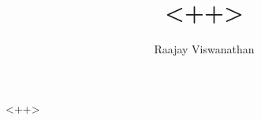 \documentclass[a4paper,10pt]{article}
\title{<++>}
\author{Raajay Viswanathan}
\begin{document}
\maketitle
<++>
  



\end{document}
